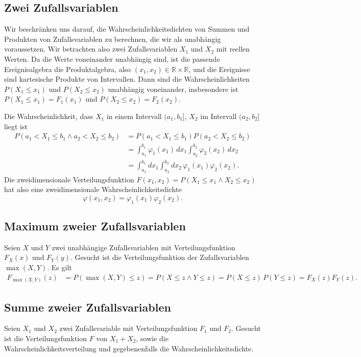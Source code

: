 \subsection{Zwei Zufallsvariablen}
Wir beschränken uns darauf, die Wahrscheinlichkeitsdichten von Summen
und Produkten von Zufallsvariablen zu berechnen, die wir als unabhängig
voraussetzen.
Wir betrachten also zwei Zufallsvariablen $X_1$ und $X_2$ mit reellen
Werten.
Da die Werte voneinander unabhängig sind, ist
die passende Ereignisalgebra die Produktalgebra, also
$(x_1,x_2)\in
\mathbb{R}\times\mathbb{R}$,
und die Ereignisse sind kartesische Produkte von Intervallen.
Dann sind
die Wahrscheinlichkeiten $P(X_1\le x_1)$  und $P(X_2\le x_2)$ unabhängig
voneinander, insbesondere ist $P(X_1\le x_1)=F_1(x_1)$ und
$P(X_2\le x_2)=F_2(x_2)$.

Die Wahrscheinlichkeit, dass $X_1$ in einem Intervall $(a_1,b_1]$,
$X_2$ im Intervall $(a_2,b_2]$ liegt ist 
\begin{align*}
P(a_1<X_1\le b_1\wedge a_2<X_2\le b_2)
&= P(a_1<X_1\le b_1) P(a_2<X_2\le b_2)\\
&=\int_{a_1}^{b_1}\varphi_1(x_1)\,dx_1
\int_{a_2}^{b_2}\varphi_2(x_2)\,dx_2\\
&=\int_{a_1}^{b_1}dx_1
\int_{a_2}^{b_2}dx_2\,
\varphi_1(x_1) \varphi_2(x_2).
\end{align*}
Die zweidimensionale
Verteilungsfunktion $F(x_1,x_2)=P(X_1\le x_1\wedge X_2\le x_2)$ hat
also eine zweidimensionale Wahrscheinlichkeitsdichte
\[
\varphi(x_1,x_2)=\varphi_1(x_1)\varphi_2(x_2).
\]

\subsection{Maximum zweier Zufallsvariablen}
Seien $X$ und $Y$ zwei unabhängige Zufallsvariablen mit Verteilungsfunktion
$F_X(x)$ und $F_Y(y)$.
Gesucht ist die Verteilungsfunktion der Zufallsvariablen
$\max(X,Y)$.
Es gilt
\begin{align*}
F_{\max(X,Y)}(z)
&=
P(\max(X,Y)\le z)
=
P(X\le z\wedge Y\le z)
=
P(X\le z)\,P(Y\le z)
=
F_X(z)F_Y(z).
\end{align*}

\subsection{Summe zweier Zufallsvariablen}
Seien $X_1$ und $X_2$ zwei Zufallsvariable mit Verteilungsfunktion $F_1$ und
$F_2$.
Gesucht ist die Verteilungsfunktion $F$ von $X_1+X_2$, sowie die
Wahrscheinlichkeitsverteilung und gegebenenfalls die Wahrscheinlichkeitsdichte.


